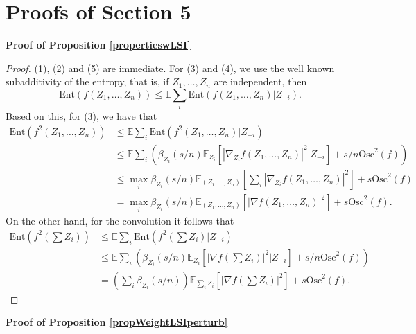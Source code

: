 \documentclass[11pt,reqno]{amsart}
\numberwithin{equation}{section}
\theoremstyle{definition}
\theoremstyle{remark}
\def \Ent {\textrm{Ent}}
\begin{document}
\section{Proofs of Section 5}\label{appendix_section_5}
\noindent \textbf{Proof of Proposition \ref{propertieswLSI}}

\begin{proof}
    (1), (2) and (5) are immediate. For (3) and (4), we use the well known subadditivity of the entropy, that is, if $Z_1, \dots, Z_n$ are independent, then
    \begin{equation*}
        \Ent(f(Z_1, \dots, Z_n))\leq \mathbb{E}\sum_i\Ent(f(Z_1, \dots, Z_n)\vert Z_{-i}).
    \end{equation*}
Based on this, for (3), we have that
\begin{align*}
    \Ent\left(f^2\left(Z_1, \dots, Z_n\right)\right)&\leq \mathbb{E}\sum_i\Ent\left(f^2\left(Z_1, \dots, Z_n\right)\vert Z_{-i}\right)\\
    &\leq \mathbb{E}\sum_i \left(\beta_{Z_i}(s/n)\mathbb{E}_{Z_i}\left[\left\vert \nabla_{Z_i} f\left( Z_1, \dots, Z_n\right)\right\vert^2\vert Z_{-i}\right] + s/n\text{Osc}^2(f)\right) \\
    &\leq \max_i\beta_{Z_i}(s/n)\mathbb{E}_{( Z_1, \dots, Z_n)}\left[\sum_i\left\vert \nabla_{Z_i} f\left( Z_1,\dots, Z_n\right)\right\vert^2\right] + s\text{Osc}^2(f) \\
    &= \max_i\beta_{Z_i}(s/n)\mathbb{E}_{( Z_1, \dots, Z_n)}\left[\left\vert \nabla f\left( Z_1,\dots, Z_n\right)\right\vert^2\right] + s\text{Osc}^2(f).
\end{align*}
On the other hand, for the convolution it follows that
\begin{align*}
    \Ent\left(f^2\left(\sum Z_i\right)\right)&\leq \mathbb{E}\sum_i\Ent\left(f^2\left(\sum Z_i\right)\vert Z_{-i}\right)\\
    &\leq \mathbb{E}\sum_i \left(\beta_{Z_i}(s/n)\mathbb{E}_{Z_i}\left[\left\vert \nabla f\left(\sum Z_i\right)\right\vert^2\vert Z_{-i}\right] + s/n\text{Osc}^2(f)\right) \\
    &= \left(\sum_i\beta_{Z_i}(s/n)\right)\mathbb{E}_{\sum_i Z_i}\left[\left\vert \nabla f\left(\sum Z_i\right)\right\vert^2\right] + s\text{Osc}^2(f).
\end{align*}
\end{proof}

\newpage
\noindent \textbf{Proof of Proposition \ref{propWeightLSIperturb}}
\end{document}
